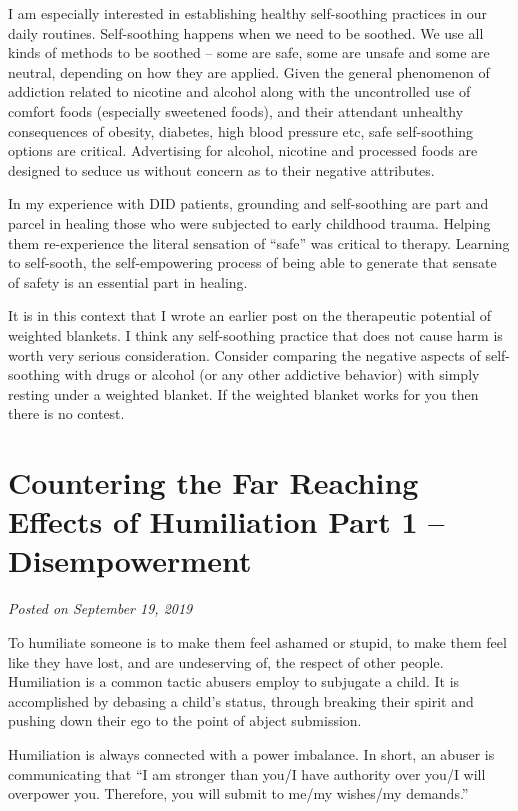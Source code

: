 \documentclass[]{book}
\begin{document}
I am especially interested in establishing healthy self-soothing practices in our daily routines. Self-soothing happens when we need to be soothed. We use all kinds of methods to be soothed -- some are safe, some are unsafe and some are neutral, depending on how they are applied. Given the general phenomenon of addiction related to nicotine and alcohol along with the uncontrolled use of comfort foods (especially sweetened foods), and their attendant unhealthy consequences of obesity, diabetes, high blood pressure etc, safe self-soothing options are critical. Advertising for alcohol, nicotine and processed foods are designed to seduce us without concern as to their negative attributes.

In my experience with DID patients, grounding and self-soothing are part and parcel in healing those who were subjected to early childhood trauma. Helping them re-experience the literal sensation of ``safe'' was critical to therapy. Learning to self-sooth, the self-empowering process of being able to generate that sensate of safety is an essential part in healing.

It is in this context that I wrote an earlier post on the therapeutic potential of weighted blankets. I think any self-soothing practice that does not cause harm is worth very serious consideration. Consider comparing the negative aspects of self-soothing with drugs or alcohol (or any other addictive behavior) with simply resting under a weighted blanket. If the weighted blanket works for you then there is no contest.

\hypertarget{countering-the-far-reaching-effects-of-humiliation-part-1-disempowerment}{%
\section{Countering the Far Reaching Effects of Humiliation Part 1 -- Disempowerment}\label{countering-the-far-reaching-effects-of-humiliation-part-1-disempowerment}}

\emph{Posted on September 19, 2019}

To humiliate someone is to make them feel ashamed or stupid, to make them feel like they have lost, and are undeserving of, the respect of other people. Humiliation is a common tactic abusers employ to subjugate a child. It is accomplished by debasing a child's status, through breaking their spirit and pushing down their ego to the point of abject submission.

Humiliation is always connected with a power imbalance. In short, an abuser is communicating that ``I am stronger than you/I have authority over you/I will overpower you. Therefore, you will submit to me/my wishes/my demands.''
\end{document}
